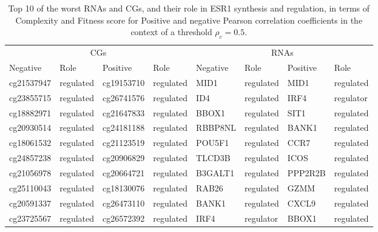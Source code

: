 \documentclass[10pt,a4paper]{article}
\begin{document}
 \begin{table}[h!]
\centering
\caption{\label{tab:tab2}Top 10 of the worst RNAs and CGs, and their role in ESR1 synthesis and regulation, in terms of Complexity and Fitness score for Positive and negative Pearson correlation coefficients in the context of a threshold $\rho_{c} = 0.5$.}
\begin{tabular}{|ll|ll|ll|ll|}
\cline{1-8}
\multicolumn{4}{|c}{CGs}&\multicolumn{4}{c|}{RNAs}\\
\cline{1-8}
Negative & Role & Positive & Role & Negative & Role & Positive & Role\\
\cline{1-8}
cg21537947 & regulated & cg19153710 & regulated & MID1 & regulated & MID1 & regulated\\
cg23855715 & regulated & cg26741576 & regulated & ID4 & regulated & IRF4 & regulator\\
cg18882971 & regulated & cg21647833 & regulated & BBOX1 & regulated & SIT1 & regulated\\
cg20930514 & regulated & cg24181188 & regulated & RBBP8NL & regulated & BANK1 & regulated\\
cg18061532 & regulated & cg21123519 & regulated & POU5F1 & regulated & CCR7 & regulated\\
cg24857238 & regulated & cg20906829 & regulated & TLCD3B & regulated & ICOS & regulated\\
cg21056978 & regulated & cg20664721 & regulated & B3GALT1 & regulated & PPP2R2B & regulated\\
cg25110043 & regulated & cg18130076 & regulated & RAB26 & regulated & GZMM & regulated\\
cg20591337 & regulated & cg26473110 & regulated & BANK1 & regulated & CXCL9 & regulated\\
cg23725567 & regulated & cg26572392 & regulated & IRF4 & regulator & BBOX1 & regulated\\
\cline{1-8}
\end{tabular}
\end{table}
\end{document}
